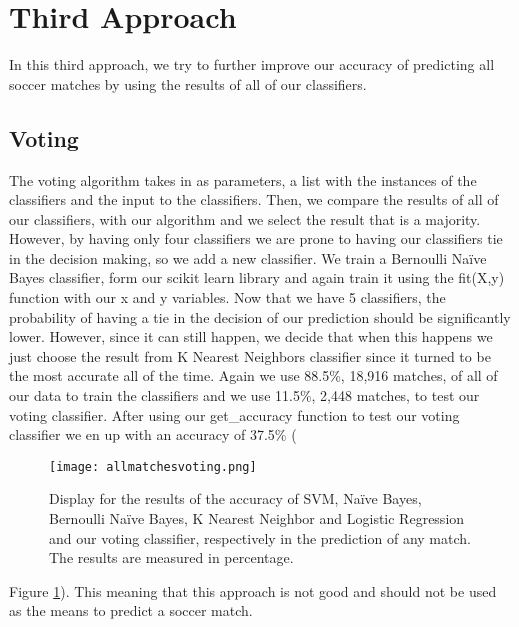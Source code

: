 \documentclass[10pt,journal,compsoc]{IEEEtran}
\begin{document}
\section{Third Approach}
In this third approach, we try to further improve our accuracy of predicting all soccer matches by using the results of all of our classifiers.

\subsection{Voting}
The voting algorithm takes in as parameters, a list with the instances of the classifiers and the input to the classifiers. Then, we compare the results of all of our classifiers, with our algorithm and we select the result that is a majority. However, by having only four classifiers we are prone to having our classifiers tie in the decision making, so we add a new classifier. We train a Bernoulli Naïve Bayes classifier, form our scikit learn library and again train it using the fit(X,y) function with our x and y variables. Now that we have 5 classifiers, the probability of having a tie in the decision of our prediction should be significantly lower. However, since it can still happen, we decide that when this happens we just choose the result from K Nearest Neighbors classifier since it turned to be the most accurate all of the time. Again we use 88.5\%, 18,916 matches, of all of our data to train the classifiers and we use 11.5\%, 2,448 matches, to test our voting classifier. After using our get\_accuracy function to test our voting classifier we en up with an accuracy of 37.5\% (\begin{figure}
  \texttt{[image: allmatchesvoting.png]}
  \caption{Display for the results of the accuracy of SVM, Naïve Bayes, Bernoulli Naïve Bayes, K Nearest Neighbor and Logistic Regression and our voting classifier, respectively in the prediction of any match. The results are measured in percentage.
}
  \label{fig:voting}
\end{figure}
Figure \ref{fig:voting}). This meaning that this approach is not good and should not be used as the means to predict a soccer match.\\
\\
\\
\end{document}
